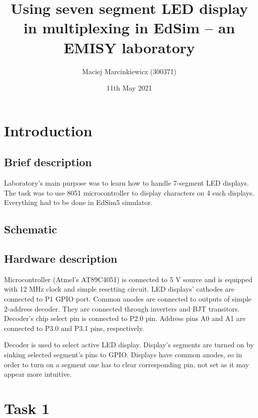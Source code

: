 \documentclass{article}
\title{Using seven segment LED display in multiplexing in EdSim -- an EMISY laboratory}
\author{Maciej Marcinkiewicz (300371)}
\date{11th May 2021}
\begin{document}
\maketitle

\section{Introduction}
\subsection{Brief description}
Laboratory's main purpose was to learn how to handle 7-segment LED displays. The task
was to use 8051 microcontroller to display characters on 4 such displays. Everything
had to be done in EdSim5 simulator.

\subsection{Schematic}

\subsection{Hardware description}
Microcontroller (Atmel's AT89C4051) is connected to 5 V source and is equipped with 12 MHz clock and 
simple resetting circuit. LED displays' cathodes are connected to P1 GPIO port. Common anodes
are connected to outputs of simple 2-address decoder. They are connected through inverters
and BJT transitors. Decoder's chip select pin is connected to P2.0 pin. Address pins
A0 and A1 are connected to P3.0 and P3.1 pins, respectively.

Decoder is used to select active LED display. Display's segments are turned on by
sinking selected segment's pins to GPIO. Displays have common anodes, so in order to
turn on a segment one has to clear corresponding pin, not set as it may appear more intuitive.

\section{Task 1}
\end{document}
